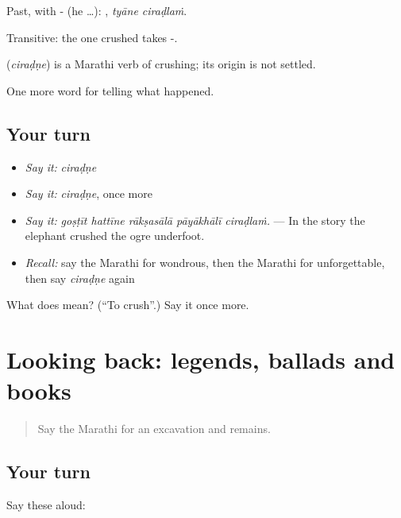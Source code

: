 Past, with - (he …):  , \emph{tyāne ciraḍlaṁ}.

Transitive: the one crushed takes -.

\begin{cousinweb}
\textbf{} (\emph{ciraḍṇe}) is a Marathi verb of crushing; its origin is not settled.
\end{cousinweb}

\begin{grammarlens}[title={What you've built}]
One more word for telling what happened.
\end{grammarlens}

\subsection*{Your turn}
\begin{itemize}
\raggedright
  \item \emph{Say it:} \emph{ciraḍṇe}
  \item \emph{Say it:} \emph{ciraḍṇe}, once more
  \item \emph{Say it:} \emph{goṣṭīt hattīne rākṣasālā pāyākhālī ciraḍlaṁ.} — In the story the elephant crushed the ogre underfoot.
  \item \emph{Recall:} say the Marathi for wondrous, then the Marathi for unforgettable, then say \emph{ciraḍṇe} again
\end{itemize}

\begin{tcolorbox}[breakable,colback=teal!4,colframe=teal!35!black,title={Before you move on}]
What does  mean? (\textquotedblleft{}To crush\textquotedblright{}.) Say it once more.
\end{tcolorbox}
\section[(dialogue)]{Looking back: legends, ballads and books}

\label{lesson:MR-R341-review-335-341}



\begin{quote}
Say the Marathi for an excavation and remains.
\end{quote}

\subsection*{Your turn}
Say these aloud:

